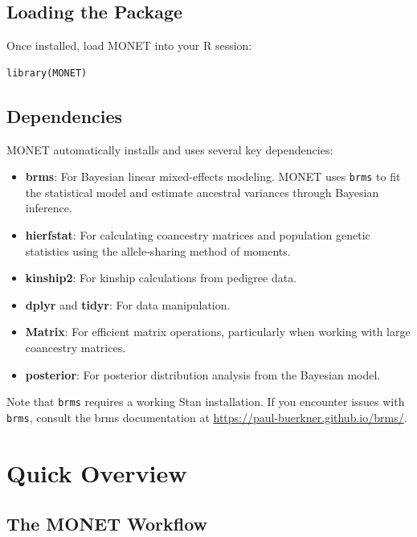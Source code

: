 \documentclass[11pt]{article}
\begin{document}
\subsection{Loading the Package}

Once installed, load MONET into your R session:

\begin{lstlisting}
library(MONET)
\end{lstlisting}

\subsection{Dependencies}

MONET automatically installs and uses several key dependencies:

\begin{itemize}
\item \textbf{brms}: For Bayesian linear mixed-effects modeling. MONET uses \texttt{brms} to fit the statistical model and estimate ancestral variances through Bayesian inference.

\item \textbf{hierfstat}: For calculating coancestry matrices and population genetic statistics using the allele-sharing method of moments.

\item \textbf{kinship2}: For kinship calculations from pedigree data.

\item \textbf{dplyr} and \textbf{tidyr}: For data manipulation.

\item \textbf{Matrix}: For efficient matrix operations, particularly when working with large coancestry matrices.

\item \textbf{posterior}: For posterior distribution analysis from the Bayesian model.
\end{itemize}

Note that \texttt{brms} requires a working Stan installation. If you encounter issues with \texttt{brms}, consult the brms documentation at \url{https://paul-buerkner.github.io/brms/}.

\section{Quick Overview}

\subsection{The MONET Workflow}
\end{document}
